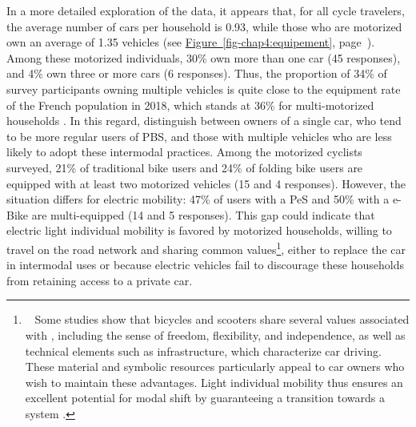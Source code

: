 \begin{refsegment}
In a more detailed exploration of the data, it appears that, for all cycle travelers, the average number of cars per household is 0.93, while those who are motorized own an average of 1.35 vehicles (see \hyperref[fig-chap4:equipement]{Figure~\ref{fig-chap4:equipement}}, page~\pageref{fig-chap4:equipement}). Among these motorized individuals, 30\% own more than one car (45 responses), and 4\% own three or more cars (6 responses). Thus, the proportion of 34\% of survey participants owning multiple vehicles is quite close to the equipment rate of the French population in 2018, which stands at 36\% for multi-motorized households \textcolor{blue}{\autocite{insee_equipement_2020}}. In this regard, \textcolor{blue}{\textcite[22]{cheng_expanding_2018}} distinguish between owners of a single car, who tend to be more regular users of \acrshort{PBS}, and those with multiple vehicles who are less likely to adopt these intermodal practices. Among the motorized cyclists surveyed, 21\% of traditional bike users and 24\% of folding bike users are equipped with at least two motorized vehicles (15 and 4 responses). However, the situation differs for electric mobility: 47\% of users with a \acrshort{PeS} and 50\% with a \acrshort{e-Bike} are multi-equipped (14 and 5 responses). This gap could indicate that electric light individual mobility is favored by motorized households, willing to travel on the road network and sharing common values\footnote{~
    Some studies show that bicycles and scooters share several values associated with  \textcolor{blue}{\autocites[57-58]{urry_sociology_2000}[28]{urry_system_2004}}, including the sense of freedom, flexibility, and independence, as well as technical elements such as infrastructure, which characterize car driving. These material and symbolic resources particularly appeal to car owners who wish to maintain these advantages. Light individual mobility thus ensures an excellent potential for modal shift by guaranteeing a transition towards a  system \textcolor{blue}{\autocite[492]{watson_how_2012}}.
}, either to replace the car in intermodal uses or because electric vehicles fail to discourage these households from retaining access to a private car.%


\end{refsegment}
